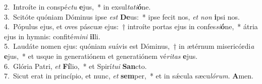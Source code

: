 {2.~}Introíte in conspé\textit{ctu} \textbf{e}jus,~* in exsul\textit{ta}\textit{ti}\textbf{ó}ne.\\
{3.~}Scitóte quóniam Dóminus ipse \textit{est} \textbf{De}us:~* ipse fecit nos, \textit{et} \textit{non} \textbf{i}psi nos.\\
{4.~}Pópulus ejus, et oves páscuæ ejus:~† introíte portas ejus in confes\textit{si}\textbf{ó}ne,~* átria ejus in hymnis: confité\textit{mi}\textit{ni} \textbf{il}li.\\
{5.~}Laudáte nomen ejus: quóniam suávis est Dóminus,~† in ætérnum misericórdi\textit{a} \textbf{e}jus,~* et usque in generatiónem et generatiónem vé\textit{ri}\textit{tas} \textbf{e}jus.\\
{6.~}Glória Patri, \textit{et} \textbf{Fí}lio,~* et Spirí\textit{tu}\textit{i} \textbf{San}cto.\\
{7.~}Sicut erat in princípio, et nunc, \textit{et} \textbf{sem}per,~* et in sǽcula sæcu\textit{ló}\textit{rum}. \textbf{A}men.\\
